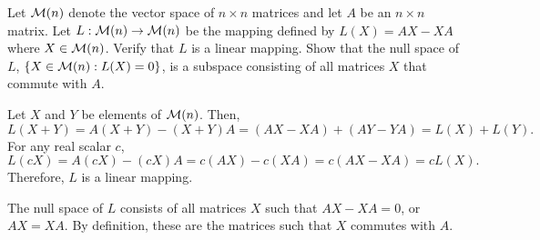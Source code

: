 \documentclass{ximera}
\begin{document}
\begin{exercise} \label{c7.2.4}
Let ${\cal M}(n)$ denote the vector space of $n\times n$
matrices and let $A$ be an $n\times n$ matrix.  Let
$L:{\cal M}(n)\to{\cal M}(n)$ be the mapping defined by
$L(X)=AX-XA$ where $X\in{\cal M}(n)$.  Verify that $L$ is
a linear mapping.  Show that the null space of $L$,
$\{X\in{\cal M}(n):L(X)=0\}$, is a subspace consisting of all
matrices $X$ that commute with $A$.

\begin{solution}

\soln Let $X$ and $Y$ be elements of ${\cal M}(n)$.  Then,
\[ 
L(X + Y) = A(X + Y) - (X + Y)A = (AX - XA) + (AY - YA) = L(X) + L(Y). 
\]
For any real scalar $c$,
\[
L(cX) = A(cX) - (cX)A = c(AX) - c(XA) = c(AX - XA) = cL(X). 
\]
Therefore, $L$ is a linear mapping.

\para The null space of $L$ consists of all matrices $X$ such that
$AX - XA = 0$, or $AX = XA$.  By definition, these are the matrices
such that $X$ commutes with $A$.  

\end{solution}
\end{exercise}
\end{document}
